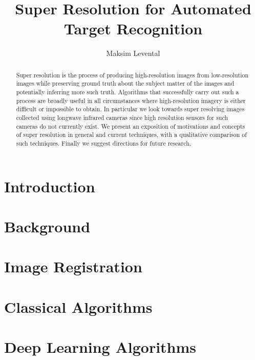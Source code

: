 \documentclass[journal]{IEEEtran}
\begin{document}
\title{Super Resolution for Automated Target Recognition}
\author{Maksim Levental}
\maketitle

\begin{abstract}
	Super resolution is the process of producing high-resolution images from low-resolution images while preserving ground truth about the subject matter of the images and potentially inferring more such truth.
	Algorithms that successfully carry out such a process are broadly useful in all circumstances where high-resolution imagery is either difficult or impossible to obtain.
	In particular we look towards super resolving images collected using longwave infrared cameras since high resolution sensors for such cameras do not currently exist.
	We present an exposition of motivations and concepts of super resolution in general and current techniques, with a qualitative comparison of such techniques.
	Finally we suggest directions for future research.
\end{abstract}

\section{Introduction}\label{sec:introduction}
\localtableofcontents


\section{Background}\label{sec:background}
\localtableofcontents


\section{Image Registration}\label{sec:image-registration}
\localtableofcontents


\section{Classical Algorithms}\label{sec:classical-algorithms}
\localtableofcontents

\clearpage


\section{Deep Learning Algorithms}\label{sec:deep-learning-algorithms}
\localtableofcontents

\end{document}
